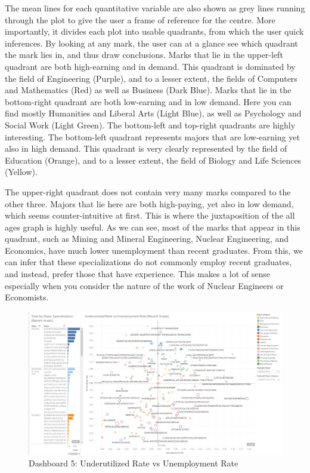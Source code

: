\documentclass[sigchi]{acmart}
\begin{document}
The mean lines for each quantitative variable are also shown as grey lines running through the plot to give the user a frame of reference for the centre. More importantly, it divides each plot into usable quadrants, from which the user quick inferences. By looking at any mark, the user can at a glance see which quadrant the mark lies in, and thus draw conclusions. Marks that lie in the upper-left quadrant are both high-earning and in demand. This quadrant is dominated by the field of Engineering (Purple), and to a lesser extent, the fields of Computers and Mathematics (Red) as well as Business (Dark Blue). Marks that lie in the bottom-right quadrant are both low-earning and in low demand. Here you can find mostly Humanities and Liberal Arts (Light Blue), as well as Psychology and Social Work (Light Green). The bottom-left and top-right quadrants are highly interesting. The bottom-left quadrant represents majors that are low-earning yet also in high demand. This quadrant is very clearly represented by the field of Education (Orange), and to a lesser extent, the field of Biology and Life Sciences (Yellow). 

The upper-right quadrant does not contain very many marks compared to the other three. Majors that lie here are both high-paying, yet also in low demand, which seems counter-intuitive at first. This is where the juxtaposition of the all ages graph is highly useful. As we can see, most of the marks that appear in this quadrant, such as Mining and Mineral Engineering, Nuclear Engineering, and Economics, have much lower unemployment than recent graduates. From this, we can infer that these specializations do not commonly employ recent graduates, and instead, prefer those that have experience. This makes a lot of sense especially when you consider the nature of the work of Nuclear Engineers or Economists.

  \begin{figure}[thpb]
  \includegraphics[width=1.0\textwidth]{DB5.png}
     \caption{Dashboard 5: Underutilized Rate vs Unemployment Rate}
         \label{fig:db5}
  \end{figure}
\end{document}
